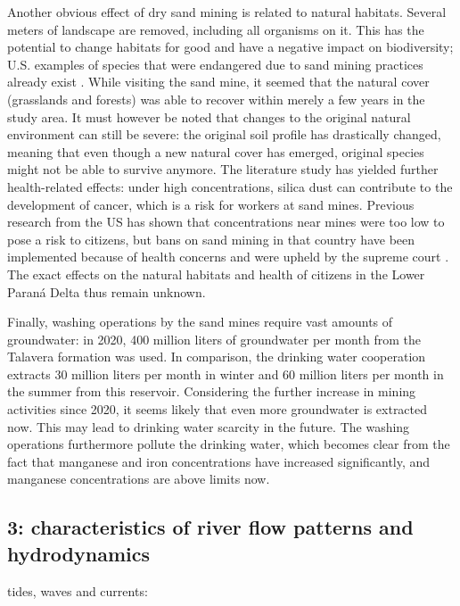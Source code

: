 Another obvious effect of dry sand mining is related to natural habitats. Several meters of landscape are removed, including all organisms on it. This has the potential to change habitats for good and have a negative impact on biodiversity; U.S. examples of species that were endangered due to sand mining practices already exist \autocite{centerforbiologicaldiversityLegalInterventionLaunched2025}. While visiting the sand mine, it seemed that the natural cover (grasslands and forests) was able to recover within merely a few years in the study area. It must however be noted that changes to the original natural environment can still be severe: the original soil profile has drastically changed, meaning that even though a new natural cover has emerged, original species might not be able to survive anymore. The literature study has yielded further health-related effects: under high concentrations, silica dust can contribute to the development of cancer, which is a risk for workers at sand mines. Previous research from the US has shown that concentrations near mines were too low to pose a risk to citizens, but bans on sand mining in that country have been implemented because of health concerns and were upheld by the supreme court \autocite{petersCommunityAirborneParticulate2017} \autocite{physiciansforsocialresponsibilityCompendiumScientificMedical2023}. The exact effects on the natural habitats and health of citizens in the Lower Paraná Delta thus remain unknown. 

Finally, washing operations by the sand mines require vast amounts of groundwater: in 2020, 400 million liters of groundwater per month from the Talavera formation was used. In comparison, the drinking water cooperation extracts 30 million liters per month in winter and 60 million liters per month in the summer from this reservoir. Considering the further increase in mining activities since 2020, it seems likely that even more groundwater is extracted now. This may lead to drinking water scarcity in the future. The washing operations furthermore pollute the drinking water, which becomes clear from the fact that manganese and iron concentrations have increased significantly, and manganese concentrations are above limits now.

\subsection{3: characteristics of river flow patterns and hydrodynamics}
tides, waves and currents: 

